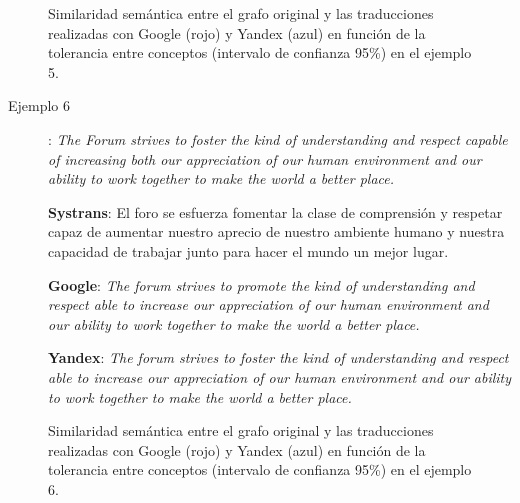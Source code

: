 \documentclass[a4paper,12pt,spanish]{book}
\begin{document}
\begin{figure}[htbp]
\centering
\capstart

\caption{Similaridad semántica entre el grafo original y las traducciones realizadas con Google (rojo) y Yandex (azul) en función de la tolerancia entre conceptos (intervalo de confianza 95\%) en el ejemplo 5.}\label{5.pruebas/index:sample05-relation-tol-0}\end{figure}
\begin{description}
\item[{Ejemplo 6}] \leavevmode
: \emph{The Forum strives to foster the kind of understanding and respect capable of increasing both our appreciation of our human environment and our ability to work together to make the world a better place.}

\textbf{Systrans}: El foro se esfuerza fomentar la clase de comprensión y respetar capaz de aumentar nuestro aprecio de nuestro ambiente humano y nuestra capacidad de trabajar junto para hacer el mundo un mejor lugar.

\textbf{Google}: \emph{The forum strives to promote the kind of understanding and respect able to increase our appreciation of our human environment and our ability to work together to make the world a better place.}

\textbf{Yandex}: \emph{The forum strives to foster the kind of understanding and respect able to increase our appreciation of our human environment and our ability to work together to make the world a better place.}

\end{description}
\begin{figure}[htbp]
\centering
\capstart

\caption{Similaridad semántica entre el grafo original y las traducciones realizadas con Google (rojo) y Yandex (azul) en función de la tolerancia entre conceptos (intervalo de confianza 95\%) en el ejemplo 6.}\label{5.pruebas/index:sample06-relation-tol-0}\end{figure}
\end{document}
